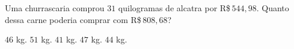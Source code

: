 Uma churrascaria comprou $31$ quilogramas de alcatra por R\$\,$544{,}98$. Quanto dessa carne poderia comprar com R\$\,$808{,}68$?

$46$ kg.
$51$ kg.
$41$ kg.
$47$ kg.
$44$ kg.



